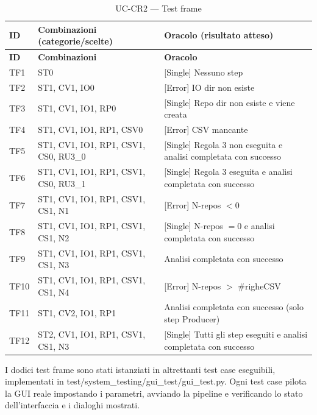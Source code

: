 \documentclass[11pt,a4paper]{article}
\makeatletter
\newif\ifmark@prevlower
\def\mark@casebreak#1{%
  \ifcat\noexpand#1\relax
    \mark@prevlowerfalse
  \else
    \ifnum`#1=\uccode`#1\relax
      \ifmark@prevlower\allowbreak\fi
      \mark@prevlowerfalse
    \else
      \ifnum`#1=\lccode`#1\relax
        \mark@prevlowertrue
      \else
        \mark@prevlowerfalse
      \fi
    \fi
  \fi}
\def\mark@brk#1{%
  \ifx#1\mark@stop
    \let\mark@next\relax
  \else
    \mark@casebreak{#1}%
    #1%
    \ifx#1.\allowbreak\else
      \ifx#1\_\allowbreak\else
        \ifx#1/\allowbreak\else
          \ifx#1(\allowbreak\fi
        \fi
      \fi
    \fi
    \let\mark@next\mark@brk
  \fi
  \mark@next}
\def\mark@stop{\mark@stop}
\DeclareRobustCommand{\mark@code}[1]{%
  \ifmmode
    \text{\ttfamily\small\mark@prevlowerfalse\mark@brk#1\mark@stop}%
  \else
    {\ttfamily\small\mark@prevlowerfalse\mark@brk#1\mark@stop}%
  \fi}
\DeclareRobustCommand{\file}[1]{\mark@code{#1}}
\def\mark@code#1{#1}%
\def\file#1{#1}%
\newcommand{\thead}[1]{\textbf{#1}}
\makeatother
\begin{document}
\begin{longtable}{@{}L{1.3cm} L{6.0cm} L{7.6cm}@{}}
  \caption{UC-CR2 --- Test frame}\label{tab:st-cr2-tf}\\
  \toprule
  \thead{ID} & \thead{Combinazioni (categorie/scelte)} &
  \thead{Oracolo (risultato atteso)}\\
  \midrule
  \endfirsthead
  \toprule
  \thead{ID} & \thead{Combinazioni} & \thead{Oracolo}\\
  \midrule
  \endhead
  \bottomrule
  \endfoot
  TF1  & ST0                                    & [Single] Nessuno step\\
  TF2  & ST1, CV1, IO0                          & [Error] IO dir non esiste\\
  TF3  & ST1, CV1, IO1, RP0                     & [Single] Repo dir non esiste e viene creata\\
  TF4  & ST1, CV1, IO1, RP1, CSV0               & [Error] CSV mancante\\
  TF5  & ST1, CV1, IO1, RP1, CSV1, CS0, RU3\_0  & [Single] Regola 3 non eseguita e analisi completata con successo\\
  TF6  & ST1, CV1, IO1, RP1, CSV1, CS0, RU3\_1  & [Single] Regola 3 eseguita e analisi completata con successo\\
  TF7  & ST1, CV1, IO1, RP1, CSV1, CS1, N1      & [Error] N-repos $<0$\\
  TF8  & ST1, CV1, IO1, RP1, CSV1, CS1, N2      & [Single] N-repos $=0$ e analisi completata con successo\\
  TF9  & ST1, CV1, IO1, RP1, CSV1, CS1, N3      & Analisi completata con successo\\
  TF10 & ST1, CV1, IO1, RP1, CSV1, CS1, N4      & [Error] N-repos $>$ \#righeCSV\\
  TF11 & ST1, CV2, IO1, RP1                     & Analisi completata con successo (solo step Producer)\\
  TF12 & ST2, CV1, IO1, RP1, CSV1, CS1, N3      & [Single] Tutti gli step eseguiti e analisi completata con successo\\
\end{longtable}

I dodici test frame sono stati istanziati in altrettanti test case eseguibili,
implementati in \file{test/system\_testing/gui\_test/gui\_test.py}. Ogni test
case pilota la GUI reale impostando i parametri, avviando la pipeline e
verificando lo stato dell'interfaccia e i dialoghi mostrati.
\end{document}
